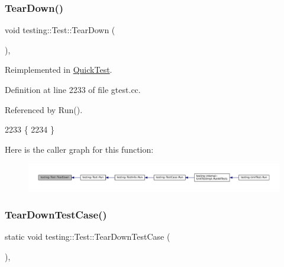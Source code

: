 \subsubsection{\texorpdfstring{Tear\+Down()}{TearDown()}}
{\footnotesize\ttfamily void testing\+::\+Test\+::\+Tear\+Down (\begin{DoxyParamCaption}{ }\end{DoxyParamCaption})\hspace{0.3cm}{\ttfamily [protected]}, {\ttfamily [virtual]}}



Reimplemented in \hyperlink{classQuickTest_a6b2d16cc0c69d30a16fe612db5abfc39}{Quick\+Test}.



Definition at line 2233 of file gtest.\+cc.



Referenced by Run().


\begin{DoxyCode}
2233                     \{
2234 \}
\end{DoxyCode}
Here is the caller graph for this function\+:
\nopagebreak
\begin{figure}[H]
\begin{center}
\leavevmode
\includegraphics[width=350pt]{classtesting_1_1Test_a2889fd829b6c712d98fb3896d28f64a3_icgraph}
\end{center}
\end{figure}
\mbox{\label{classtesting_1_1Test_af374706cbaf0ffc460f4fd04e7c150f1}} 
\subsubsection{\texorpdfstring{Tear\+Down\+Test\+Case()}{TearDownTestCase()}}
{\footnotesize\ttfamily static void testing\+::\+Test\+::\+Tear\+Down\+Test\+Case (\begin{DoxyParamCaption}{ }\end{DoxyParamCaption})\hspace{0.3cm}{\ttfamily [inline]}, {\ttfamily [static]}}



